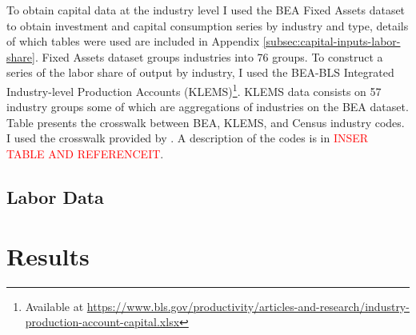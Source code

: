\documentclass[12pt]{article}
\begin{document}
To obtain capital data at the industry level I used the BEA Fixed Assets dataset to obtain investment and capital consumption series by industry and type, details of which tables were used are included in Appendix \ref{subsec:capital-inputs-labor-share}. Fixed Assets dataset groups industries into 76 groups. To construct a series of the labor share of output by industry, I used the BEA-BLS Integrated Industry-level Production Accounts (KLEMS)\footnote{Available at \url{https://www.bls.gov/productivity/articles-and-research/industry-production-account-capital.xlsx}}. KLEMS data consists on 57 industry groups some of which are aggregations of industries on the BEA dataset. Table %
presents the crosswalk between BEA, KLEMS, and Census industry codes. I used the crosswalk provided by \citep{acemoglu2020unpacking}. A description of the codes is in \textcolor{red}{INSER TABLE AND REFERENCEIT}.

\subsection{Labor Data}\label{sec:labor_data}

\section{Results}\label{sec:results}



\end{document}
